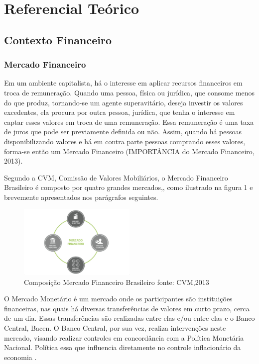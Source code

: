 
\newpage

\chapter[REFERENCIAL TEÓRICO]{Referencial Teórico}
\section{Contexto Financeiro}
\subsection{Mercado Financeiro}

Em um ambiente capitalista, há o interesse em aplicar recursos financeiros em troca de remuneração. Quando uma pessoa, física ou jurídica, que consome menos do que produz, tornando-se um agente superavitário, deseja investir os valores excedentes, ela procura por outra pessoa, jurídica, que tenha o interesse em captar esses valores em troca de uma remuneração. Essa remuneração é uma taxa de juros que pode ser previamente definida ou não. Assim, quando há pessoas disponibilizando valores e há em contra parte pessoas comprando esses valores, forma-se então um Mercado Financeiro (IMPORTÂNCIA do Mercado Financeiro, 2013).

Segundo a CVM, Comissão de Valores Mobiliários, o Mercado Financeiro Brasileiro é composto por quatro grandes mercados,\cite[p. 15]{cmv2014}, como ilustrado na figura 1 e brevemente apresentados nos parágrafos seguintes.

\begin{figure}[h]
\centering
\label{f01}
\includegraphics[width=0.5\textwidth]{figuras/f01}
\caption{Composição Mercado Financeiro Brasileiro  \newline fonte: CVM,2013}

\end{figure}

O Mercado Monetário é um mercado onde os participantes são instituições financeiras, nas quais há diversas transferências de valores em curto prazo, cerca de um dia. Essas transferências são realizadas entre elas e/ou entre elas e o Banco Central, Bacen. O Banco Central, por sua vez, realiza intervenções neste mercado, visando realizar controles em concordância com a Política Monetária Nacional. Política essa que influencia diretamente no controle inflacionário da economia \cite[p. 32]{cmv2014}.

